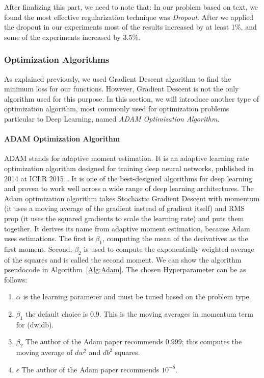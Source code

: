 After finalizing this part, we need to note that: In our problem based on text, we found the most effective regularization technique was \textit{Dropout}. After we applied the dropout in our experiments most of the results increased by at least 1\%, and some of the experiments increased by 3.5\%.

\subsubsection{Optimization Algorithms}
As explained previously, we used Gradient Descent algorithm to find the minimum loss for our functions. However, Gradient Descent is not the only algorithm used for this purpose. In this section, we will introduce another type of optimization algorithm, most commonly used for optimization problems particular to Deep Learning, named \textit{ADAM Optimization Algorithm}.

\paragraph{ADAM Optimization Algorithm}
ADAM stands for adaptive moment estimation. It is an adaptive learning rate optimization algorithm designed for training deep neural networks, published in 2014 at ICLR 2015~\cite{Adam_2014}. It is one of the best-designed algorithms for deep learning and proven to work well across a wide range of deep learning architectures. The Adam optimization algorithm takes Stochastic Gradient Descent with momentum (it uses a moving average of the gradient instead of gradient itself) and RMS prop (it uses the squared gradients to scale the learning rate) and puts them together. It derives its name from adaptive moment estimation, because Adam uses estimations. The first is $\beta_1$, computing the mean of the derivatives as the first moment. Second, $\beta_2$ is used to compute the exponentially weighted average of the squares and is called the second moment. We can show the algorithm pseudocode in Algorithm~\ref{Alg:Adam}. The chosen Hyperparameter can be as follows:

\begin{enumerate}
\item $\alpha$ is the learning parameter and must be tuned based on the problem type.
\item $\beta_1$ the default choice is 0.9. This is the moving averages in momentum term for (dw,db).
\item $\beta_2$ The author of the Adam paper recommends $0.999$; this computes the moving average of $dw^2$ and $db^2$ squares.
\item $\epsilon$ The author of the Adam paper recommends $10^{-8}$.
\end{enumerate}%

